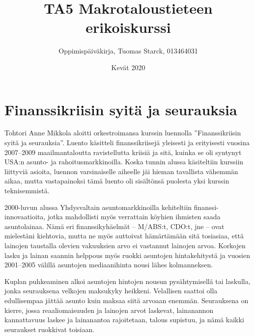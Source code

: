\documentclass[12pt]{article}
\begin{document}
\title{TA5 Makrotaloustieteen erikoiskurssi}
\author{Oppimispäiväkirja, Tuomas Starck, 013464031}
\date{Kevät 2020}
\maketitle

%
%

\newpage
\section{Finanssikriisin syitä ja seurauksia}

Tohtori Anne Mikkola aloitti orkestroimansa kurssin luennolla ''Finanssikriisin syitä ja seurauksia''. Luento käsitteli finanssikriisejä yleisesti ja erityisesti vuosina 2007–2009 maailmantaloutta ravistellutta kriisiä ja sitä, kuinka se oli syntynyt USA:n asunto- ja rahoitusmarkkinoilla. Koska tunnin alussa käsiteltiin kurssiin liittyviä asioita, luennon varsinaiselle aiheelle jäi hieman tavallista vähemmän aikaa, mutta vastapainoksi tämä luento oli sisältönsä puolesta yksi kurssin teknisemmistä.

2000-luvun alussa Yhdysvaltain asuntomarkkinoilla kehiteltiin finanssi-innovaatioita, jotka mahdollisti myös verrattain köyhien ihmisten saada asuntolainaa. Nämä eri finanssikyhäelmät – M/ABS:t, CDO:t, jne – ovat mielestäni kiehtovia, mutta ne myös auttoivat hämärtämään sitä tosiasiaa, että lainojen taustalla olevien vakuuksien arvo ei vastannut lainojen arvoa. Korkojen lasku ja lainan saannin helppous myös ruokki asuntojen hintakehitystä ja vuosien 2001–2005 välillä asuntojen mediaanihinta nousi lähes kolmanneksen.

Kuplan puhkeaminen alkoi asuntojen hintojen nousun pysähtymisellä tai laskulla, jonka seurauksena velkojen maksukyky heikkeni. Velallisen saattoi olla edullisempaa jättää asunto kuin maksaa siitä arvoaan enemmän. Seurauksena on kierre, jossa reaaliomaisuuden ja lainojen arvot laskevat, lainanannon kannattavuus laskee ja lainanantoa rajoitetaan, talous supistuu, ja nämä kaikki seuraukset ruokkivat toisiaan.
\end{document}
